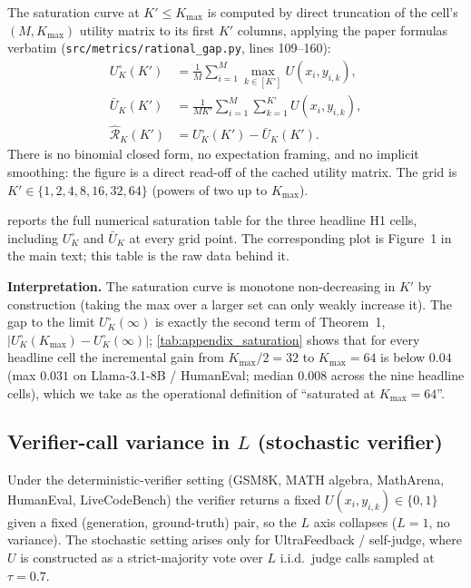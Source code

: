 The saturation curve at $K'\leq K_{\max}$ is computed by direct
truncation of the cell's $(M, K_{\max})$ utility matrix to its first
$K'$ columns, applying the paper formulas verbatim
(\texttt{src/metrics/rational\_gap.py}, lines 109--160):
\begin{align}
U^\circ_K(K') &= \tfrac{1}{M}\sum_{i=1}^{M} \max_{k\in[K']} U(x_i, y_{i,k}), \\
\bar U_K(K')  &= \tfrac{1}{MK'} \sum_{i=1}^{M} \sum_{k=1}^{K'} U(x_i, y_{i,k}), \\
\hat{\mathcal R}_K(K')  &= U^\circ_K(K') - \bar U_K(K').
\end{align}
There is no binomial closed form, no expectation framing, and no
implicit smoothing: the figure is a direct read-off of the cached
utility matrix. The grid is
$K' \in \{1, 2, 4, 8, 16, 32, 64\}$ (powers of two up to $K_{\max}$).

 reports the full numerical saturation table
for the three headline H1 cells, including $U^\circ_K$ and $\bar U_K$ at
every grid point. The corresponding plot is Figure~1 in the main text;
this table is the raw data behind it.



\textbf{Interpretation.} The saturation curve is monotone non-decreasing
in $K'$ by construction (taking the max over a larger set can only
weakly increase it). The gap to the limit $U^\circ_K(\infty)$ is exactly
the second term of Theorem~1, $|U^\circ_K(K_{\max}) - U^\circ_K(\infty)|$;
\cref{tab:appendix_saturation} shows that for every headline cell the
incremental gain from $K_{\max}/2{=}32$ to $K_{\max}{=}64$ is below
$0.04$ (max $0.031$ on Llama-3.1-8B / HumanEval; median $0.008$
across the nine headline cells), which we take as the operational
definition of ``saturated at $K_{\max}{=}64$''.

\subsection{Verifier-call variance in \texorpdfstring{$L$}{L} (stochastic verifier)}
\label{app:calibration:L}

Under the deterministic-verifier setting (GSM8K, MATH algebra, MathArena,
HumanEval, LiveCodeBench) the verifier returns a fixed
$U(x_i, y_{i,k}) \in \{0,1\}$ given a fixed (generation, ground-truth)
pair, so the $L$ axis collapses ($L=1$, no variance). The stochastic
setting arises only for UltraFeedback / self-judge, where $U$ is
constructed as a strict-majority vote over $L$ i.i.d.\ judge calls
sampled at $\tau=0.7$.

